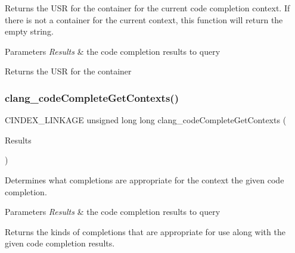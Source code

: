 Returns the U\+SR for the container for the current code completion context. If there is not a container for the current context, this function will return the empty string. 


\begin{DoxyParams}{Parameters}
{\em Results} & the code completion results to query\\
\hline
\end{DoxyParams}
\begin{DoxyReturn}{Returns}
the U\+SR for the container 
\end{DoxyReturn}
\mbox{\label{group__CINDEX__CODE__COMPLET_ga76f5354e478002585b6bd3aba1d20582}} 
\subsubsection{\texorpdfstring{clang\+\_\+code\+Complete\+Get\+Contexts()}{clang\_codeCompleteGetContexts()}}
{\footnotesize\ttfamily C\+I\+N\+D\+E\+X\+\_\+\+L\+I\+N\+K\+A\+GE unsigned long long clang\+\_\+code\+Complete\+Get\+Contexts (\begin{DoxyParamCaption}\item[{\hyperlink{structCXCodeCompleteResults}{C\+X\+Code\+Complete\+Results} $\ast$}]{Results }\end{DoxyParamCaption})}



Determines what completions are appropriate for the context the given code completion. 


\begin{DoxyParams}{Parameters}
{\em Results} & the code completion results to query\\
\hline
\end{DoxyParams}
\begin{DoxyReturn}{Returns}
the kinds of completions that are appropriate for use along with the given code completion results. 
\end{DoxyReturn}
\mbox{\label{group__CINDEX__CODE__COMPLET_gab298febc86d15c50265ff440e6da1913}} 
